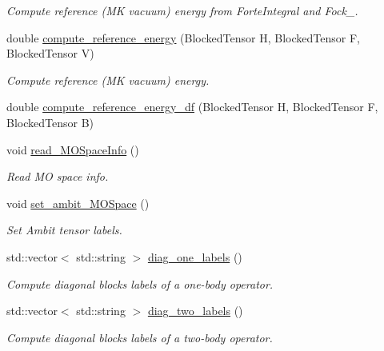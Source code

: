 \begin{DoxyCompactItemize}
\begin{DoxyCompactList}\small\item\em Compute reference (MK vacuum) energy from Forte\+Integral and Fock\+\_\+. \end{DoxyCompactList}\item 
double \mbox{\hyperlink{classforte_1_1_m_a_s_t_e_r___d_s_r_g_af5645674246c3f91b9f6c81d507834ba}{compute\+\_\+reference\+\_\+energy}} (Blocked\+Tensor H, Blocked\+Tensor F, Blocked\+Tensor V)
\begin{DoxyCompactList}\small\item\em Compute reference (MK vacuum) energy. \end{DoxyCompactList}\item 
double \mbox{\hyperlink{classforte_1_1_m_a_s_t_e_r___d_s_r_g_aaa6a8d82990682045f25b7ea425a75c2}{compute\+\_\+reference\+\_\+energy\+\_\+df}} (Blocked\+Tensor H, Blocked\+Tensor F, Blocked\+Tensor B)
\item 
void \mbox{\hyperlink{classforte_1_1_m_a_s_t_e_r___d_s_r_g_a4c7eea23d0973346ae114df54cd689fa}{read\+\_\+\+M\+O\+Space\+Info}} ()
\begin{DoxyCompactList}\small\item\em Read MO space info. \end{DoxyCompactList}\item 
void \mbox{\hyperlink{classforte_1_1_m_a_s_t_e_r___d_s_r_g_a8cbfdaab152ad502cec7aaf76230bb9c}{set\+\_\+ambit\+\_\+\+M\+O\+Space}} ()
\begin{DoxyCompactList}\small\item\em Set Ambit tensor labels. \end{DoxyCompactList}\item 
std\+::vector$<$ std\+::string $>$ \mbox{\hyperlink{classforte_1_1_m_a_s_t_e_r___d_s_r_g_a033c9c47a263276b244f785ff17eb021}{diag\+\_\+one\+\_\+labels}} ()
\begin{DoxyCompactList}\small\item\em Compute diagonal blocks labels of a one-\/body operator. \end{DoxyCompactList}\item 
std\+::vector$<$ std\+::string $>$ \mbox{\hyperlink{classforte_1_1_m_a_s_t_e_r___d_s_r_g_a952117c90bb81a025be16810cd8362c8}{diag\+\_\+two\+\_\+labels}} ()
\begin{DoxyCompactList}\small\item\em Compute diagonal blocks labels of a two-\/body operator. \end{DoxyCompactList}\item 

\end{DoxyCompactItemize}
